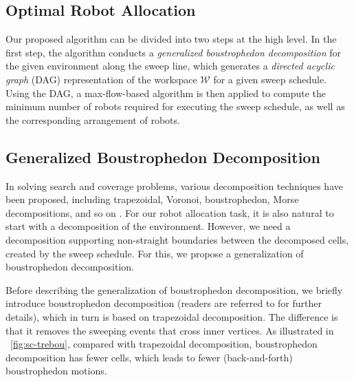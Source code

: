 
\subsection{Optimal Robot Allocation}


Our proposed algorithm can be divided into two steps at the high level. 
In the first step, the algorithm conducts a \emph{generalized boustrophedon 
decomposition} for the given environment along the sweep line, 
which generates a \textit{directed acyclic graph} (DAG) representation 
of the workspace $\mathcal W$ for a given sweep schedule. 
Using the DAG, a max-flow-based algorithm is then applied to compute the 
minimum number of robots required for executing the sweep schedule, 
as well as the corresponding arrangement of robots.

\subsection{Generalized Boustrophedon Decomposition}
In solving search and coverage problems, various decomposition techniques 
have been proposed, including trapezoidal, Voronoi, boustrophedon, Morse decompositions, 
and so on \cite{huang2001optimal, choset2000coverage, breitenmoser2010voronoi, acar2002morse}.
For our robot allocation task, it is also natural to start with a decomposition 
of the environment. 
However, we need a decomposition supporting non-straight 
boundaries between the decomposed cells, created by the sweep schedule. 
For this, we propose a generalization of boustrophedon decomposition. 

Before describing the generalization of boustrophedon decomposition, 
we briefly introduce boustrophedon decomposition (readers are referred to 
\cite{choset2000coverage} for further details), which in turn is based on 
trapezoidal decomposition. The difference is that it removes the sweeping 
events that cross inner vertices. As illustrated in ~\ref{fig:sc-trebou},
compared with trapezoidal decomposition, boustrophedon decomposition 
has fewer cells, which leads to fewer (back-and-forth) boustrophedon motions.

